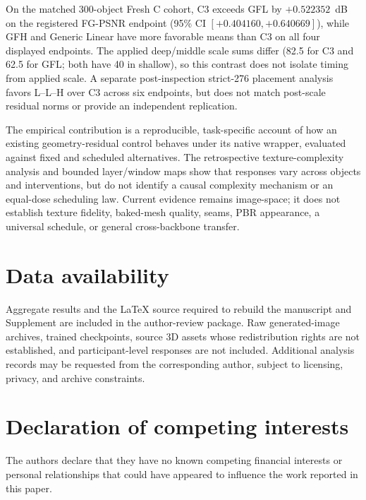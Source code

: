 \documentclass[times,twocolumn,final]{elsarticle}
\begin{document}
On the matched 300-object Fresh C cohort, C3 exceeds GFL by $+0.522352$~dB on the registered FG-PSNR endpoint (95\% CI $[+0.404160,+0.640669]$), while GFH and Generic Linear have more favorable means than C3 on all four displayed endpoints. The applied deep/middle scale sums differ (82.5 for C3 and 62.5 for GFL; both have 40 in shallow), so this contrast does not isolate timing from applied scale. A separate post-inspection strict-276 placement analysis favors L--L--H over C3 across six endpoints, but does not match post-scale residual norms or provide an independent replication.

The empirical contribution is a reproducible, task-specific account of how an existing geometry-residual control behaves under its native wrapper, evaluated against fixed and scheduled alternatives. The retrospective texture-complexity analysis and bounded layer/window maps show that responses vary across objects and interventions, but do not identify a causal complexity mechanism or an equal-dose scheduling law. Current evidence remains image-space; it does not establish texture fidelity, baked-mesh quality, seams, PBR appearance, a universal schedule, or general cross-backbone transfer.

\section*{Data availability}

Aggregate results and the LaTeX source required to rebuild the manuscript and Supplement are included in the author-review package. Raw generated-image archives, trained checkpoints, source 3D assets whose redistribution rights are not established, and participant-level responses are not included. Additional analysis records may be requested from the corresponding author, subject to licensing, privacy, and archive constraints.

\section*{Declaration of competing interests}

The authors declare that they have no known competing financial interests or personal relationships that could have appeared to influence the work reported in this paper.
\end{document}
